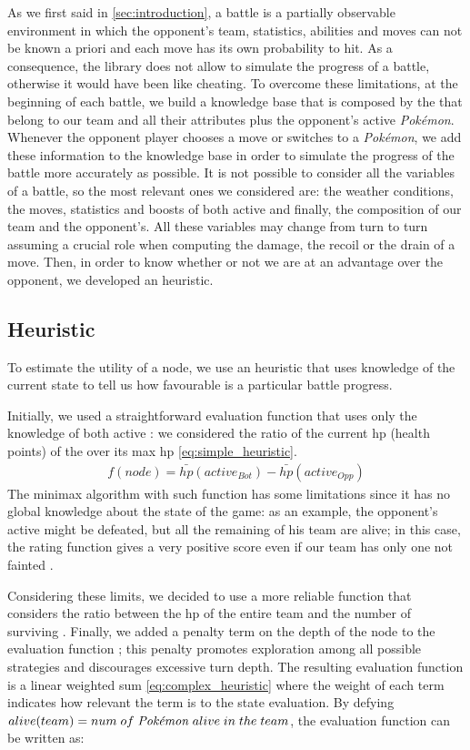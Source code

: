 As we first said in \autoref{sec:introduction}, a \poke battle is a partially observable environment in which the opponent’s team, \poke statistics, abilities and moves can not be known a priori and each move has its own probability to hit. As a consequence, the library \cite{poke_env} does not allow to simulate the progress of a battle, otherwise it would have been like cheating. To overcome these limitations, at the beginning of each battle, we build a knowledge base that is composed by the \poke that belong to our team and all their attributes plus the opponent's active \textit{Pokémon}. Whenever the opponent player chooses a move or switches to a \textit{Pokémon}, we add these information to the knowledge base in order to simulate the progress of the battle more accurately as possible. It is not possible to consider all the variables of a battle, so the most relevant ones we considered are: the weather conditions, the moves, statistics and boosts of both active \poke and finally, the composition of our team and the opponent's. All these variables may change from turn to turn assuming a crucial role when computing the damage, the recoil or the drain of a move. Then, in order to know whether or not we are at an advantage over the opponent, we developed an heuristic.

\subsection{Heuristic}\label{subsec:heuristic}
To estimate the utility of a node, we use an heuristic that uses knowledge of the current state to tell us how favourable is a particular battle progress.

Initially, we used a straightforward evaluation function that uses only the knowledge of both active \poke: we considered the ratio of the current hp (health points) of the \poke over its max hp \eqref{eq:simple_heuristic}.
\begin{multline}
    f(node)=\bar{hp}\left(active_{Bot}\right)-\bar{hp}\left(active_{Opp}\right)
    \label{eq:simple_heuristic}
\end{multline}
The minimax algorithm with such function has some limitations since it has no global knowledge about the state of the game: as an example, the opponent's active \poke might be defeated, but all the remaining \poke of his team are alive; in this case, the rating function gives a very positive score even if our team has only one not fainted \poke.

Considering these limits, we decided to use a more reliable function that considers the ratio between the hp of the entire team and the number of surviving \poke. Finally, we added a penalty term on the depth of the node to the evaluation function \cite{showdown_competition}; this penalty promotes exploration among all possible strategies and discourages excessive turn depth.
The resulting evaluation function is a linear weighted sum \eqref{eq:complex_heuristic} where the weight of each term indicates how relevant the term is to the state evaluation. By defying $alive(team)= num \; of \; \text{\textit{Pokémon}} \; alive \; in \; the \; team$, the evaluation function can be written as:

